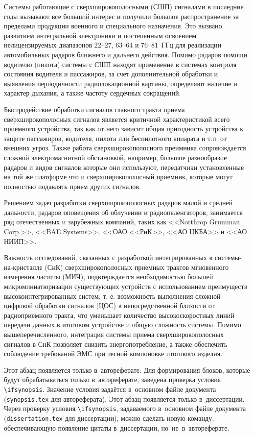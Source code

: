 
{\actuality} Системы работающие с сверхширокополосными (СШП) сигналами в последние годы вызывают все больший интерес и получили большое распространение за пределами продукции военного и специального назначения. Это вызвано развитием интегральной электроники и постепенным освоением нелицензируемых диапазонов \numrange[]{22}{27}, \numrange[]{63}{64} и \numrange[]{76}{81}~ГГц для реализации автомобильных радаров ближнего и дальнего действия. Помимо радаров помощи водителю (пилота) системы с СШП находят применение в системах контроля состояния водителя и пассажиров, за счет дополнительной обработки и выявления периодичности радиолокационной картины, определяют наличие и характер дыхания, а также частоту сердечных сокращений.

Быстродействие обработки сигналов главного тракта приема сверхширокополосных сигналов является критичной характеристикой всего приемного устройства, так как от него зависит общая пригодность устройства к защите пассажиров, водителя, пилота или беспилотного аппарата и т.п. от внешних угроз. Также работа сверхширокополосного преимника сопровождается сложной электромагнитной обстановкой, например, большое разнообразие радаров и видов сигналов которые они используют, передатчики установленные на той же платформе что и сверхширокополосный приемник, которые могут полностью подавлять прием других сигналов.

Решением задач разработки сверхширокополосных радаров малой и средней дальности, радаров оповещения об облучении и радиопеленгаторов, занимается ряд отечественных и зарубежных компаний, таких как  <<Northrop Grumman Corp.>>, <<BAE Systems>>, <<ОАО <<РиК>>, <<АО ЦКБА>> и <<АО НИИП>>.

Важность исследований, связанных с разработкой интегрированных в системы-на-кристалле (СнК) сверхширокополосных приемных трактов мгновенного измерения частоты (МИЧ), подвтерждается необходимостью большей микроминиатюризации существующих устройств с использованием преимуществ высокоинтегрированных систем, т. е. возможность выполнения сложной цифровой обработки сигналов (ЦОС) в непосредственной близости от радиоприемного тракта, что уменьшает количество высокоскоростных линий передачи данных в итоговом устройстве и общую сложность системы. Помимо вышеперечисленного, интеграция системы приема сверхширокополосных сигналов в СнК позволяет снизить энергопотребление, а также обеспечить соблюдение требований ЭМС при тесной компоновке итогового изделия.

\ifsynopsis
Этот абзац появляется только в~автореферате.
Для формирования блоков, которые будут обрабатываться только в~автореферате,
заведена проверка условия \verb!\!\verb!ifsynopsis!.
Значение условия задаётся в~основном файле документа (\verb!synopsis.tex! для
автореферата).
\else
Этот абзац появляется только в~диссертации.
Через проверку условия \verb!\!\verb!ifsynopsis!, задаваемого в~основном файле
документа (\verb!dissertation.tex! для диссертации), можно сделать новую
команду, обеспечивающую появление цитаты в~диссертации, но~не~в~автореферате.
\fi

